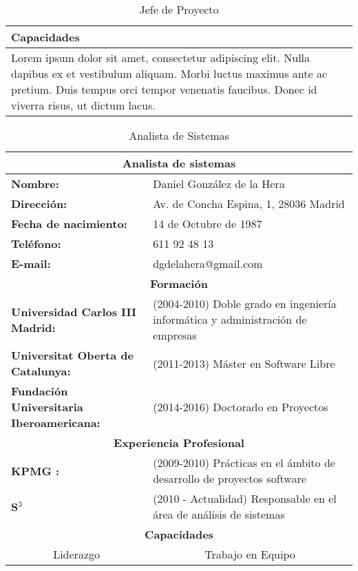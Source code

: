 \begin{table}[H]
\begin{center}
\begin{tabular}{p{}}
\hline \hline
\textbf{Capacidades}  \\
\hline
Lorem ipsum dolor sit amet, consectetur adipiscing elit. Nulla dapibus ex et vestibulum aliquam. Morbi luctus maximus ante ac pretium. Duis tempus orci tempor venenatis faucibus. Donec id viverra risus, ut dictum lacus. \\
\hline \hline
\end{tabular}
\caption{Jefe de Proyecto}
\label{tab:jefeDeProyecto}
\end{center}
\end{table}

\begin{table}[H]
\begin{center}
\begin{tabular}{p{} p{9cm}}
\multicolumn{2}{c}{\Large{\textbf{Analista de sistemas}}} \\
\hline
\textbf{Nombre:} & Daniel González de la Hera\\
\textbf{Dirección:} & Av. de Concha Espina, 1, 28036 Madrid\\
\textbf{Fecha de nacimiento:} & 14 de Octubre de 1987 \\
\textbf{Teléfono:} & 611 92 48 13\\
\textbf{E-mail:} & dgdelahera@gmail.com\\
\hline \hline
\multicolumn{2}{c}{\textbf{Formación} } \\
\hline
\textbf{Universidad Carlos III Madrid:} &  (2004-2010) Doble grado en ingeniería informática y administración de empresas  \\
\textbf{Universitat Oberta de Catalunya:} &  (2011-2013) Máster en Software Libre   \\
\textbf{Fundación Universitaria Iberoamericana:} &  (2014-2016) Doctorado en Proyectos    \\
\hline \hline
\multicolumn{2}{c}{\textbf{Experiencia Profesional} } \\
\hline
\textbf{KPMG :} &  (2009-2010) Prácticas en el ámbito de desarrollo de proyectos software  \\
\textbf{S$^3$} & (2010 - Actualidad) Responsable en el área de análisis de sistemas\\
\hline \hline
\multicolumn{2}{c}{\textbf{Capacidades} } \\
\hline
\multicolumn{1}{c}{Liderazgo} & \multicolumn{1}{c}{Trabajo en Equipo} \\
\hline
\end{tabular}
\caption{Analista de Sistemas}
\label{tab:AnalistadeSistemas}
\end{center}
\end{table}


